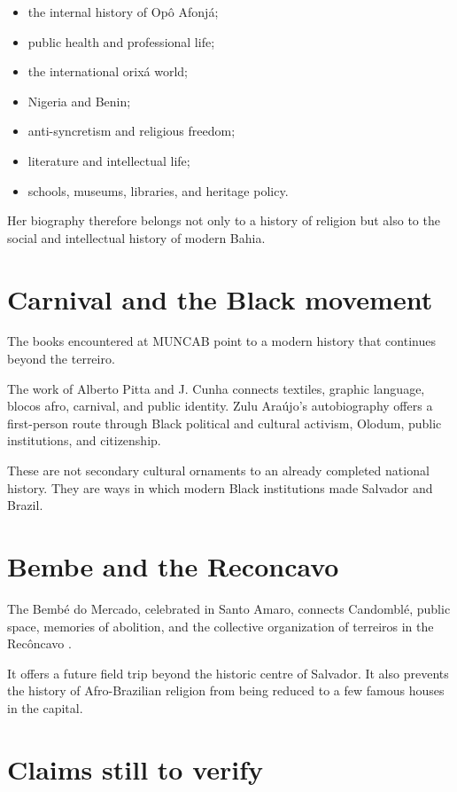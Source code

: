 \begin{itemize}
\item the internal history of Op\^o Afonj\'a;
\item public health and professional life;
\item the international orix\'a world;
\item Nigeria and Benin;
\item anti-syncretism and religious
freedom;
\item literature and intellectual life;
\item schools, museums, libraries, and
heritage policy.
\end{itemize}

Her biography therefore belongs not only
to a history of religion but also to the
social and intellectual history of modern
Bahia.

\section{Carnival and the Black movement}
\label{section-carnival-black-movement}

The books encountered at MUNCAB point to a
modern history that continues beyond the
terreiro.

The work of Alberto Pitta and J. Cunha
connects textiles, graphic language,
blocos afro, carnival, and public identity.
Zulu Ara\'ujo's autobiography offers a
first-person route through Black political
and cultural activism, Olodum, public
institutions, and citizenship.

These are not secondary cultural ornaments
to an already completed national history.
They are ways in which modern Black
institutions made Salvador and Brazil.

\section{Bembe and the Reconcavo}
\label{section-history-bembe}

The Bemb\'e do Mercado, celebrated in Santo
Amaro, connects Candombl\'e, public space,
memories of abolition, and the collective
organization of terreiros in the
Rec\^oncavo \cite{ufrb2026bembe}.

It offers a future field trip beyond the
historic centre of Salvador.  It also
prevents the history of Afro-Brazilian
religion from being reduced to a few famous
houses in the capital.

\section{Claims still to verify}
\label{section-history-open-claims}

